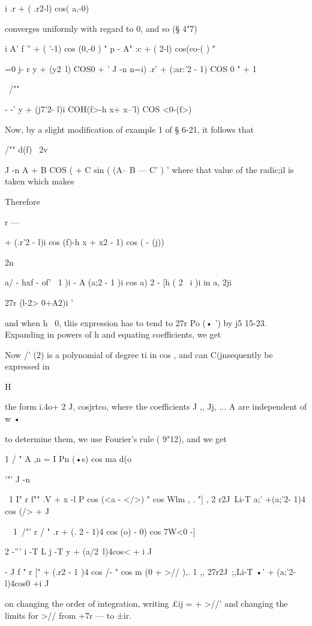 {{{i .r + ( .r2-l) cos( a,-0)

converges uniformly with regard to 0, and so (§ 4"7)

i A' f '' + ( '-1) cos (0,-0 ) " p - A" :c + ( 2-l) cos(co-( ) "

 =0 j- r y + (y2\ l) COS0 + ' J -n n=i) .r' + (;ar:'2 - 1) COS 0 " + 1

\ /""

- -' y + (j7'2- l)i COH(f>-h x+ x--'l) COS <0-(f>)

Now, by a slight modification of example 1 of § 6-21, it follows that

/"" d(f) \ 2v

J -n A + B COS ( + C sin ( (A-- B — C' ) ' where that value of the
radic;il is taken which makes

Therefore



r —



+ (.r'2 - l)i cos (f)-h x + x2 - 1) cos ( - (j))

2n



  a/ - hxf - of' \ 1 )i - A (a;2 - 1 )i cos a) 2 - [h ( 2 \ i )i in a,
2ji

27r (l-2> 0+A2)i '

and when h~ 0, tliis expression has to tend to 27r Po (• ') by j5
15-23. Expanding in powers of h and equating coefficients, we get

Now /' (2) is a polynomial of degree ti in cos , and can C(jnsequently
be expressed in

H

the form i.4o+ 2 J, cosjrtco, where the coefficients J ,, Jj, ... A
are independent of w •

to determine them, we use Fourier's rule ( 9"12), and we get

1 / " A ,n = I Pn (•s) cos ma d(o

'"' J -n

\ 1 I" r f"" .V + x -l P cos (<a - </>) " cos Wlm , . "] , 2 r2J\ Li-T
a;' +(a;'2- 1)4 cos (/> + J

\ \ 1\ /"' r / " .r + (. 2 - 1)4 cos (o) - 0) cos 7W<0 -]

2 -''' i -T L j -T y + (a/2\ l)4cos< + i J

- J f " r [" + (.r2 - 1 )4 cos /- " cos m (0 + >// ),. 1 ,, 27r2J\
;,Li-T •' + (a;'2-l)4cos0 +i J

on changing the order of integration, writing £ij = + >//' and
changing the limits for >// from +7r — to ±ir.



}}}
